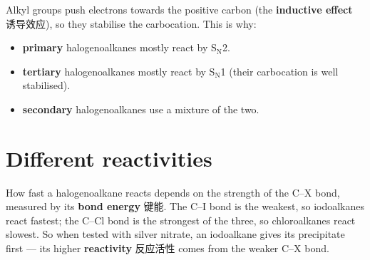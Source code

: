 \documentclass[11pt]{article}
\begin{document}
Alkyl groups push electrons towards the positive carbon (the \textbf{inductive effect} 诱导效应), so they stabilise the carbocation. This is why:

\begin{itemize}
\item \textbf{primary} halogenoalkanes mostly react by S$_\text{N}$2.

\item \textbf{tertiary} halogenoalkanes mostly react by S$_\text{N}$1 (their carbocation is well stabilised).

\item \textbf{secondary} halogenoalkanes use a mixture of the two.

\end{itemize}

\section*{Different reactivities}

How fast a halogenoalkane reacts depends on the strength of the C–X bond, measured by its \textbf{bond energy} 键能. The C–I bond is the weakest, so iodoalkanes react fastest; the C–Cl bond is the strongest of the three, so chloroalkanes react slowest. So when tested with silver nitrate, an iodoalkane gives its precipitate first — its higher \textbf{reactivity} 反应活性 comes from the weaker C–X bond.
\end{document}
